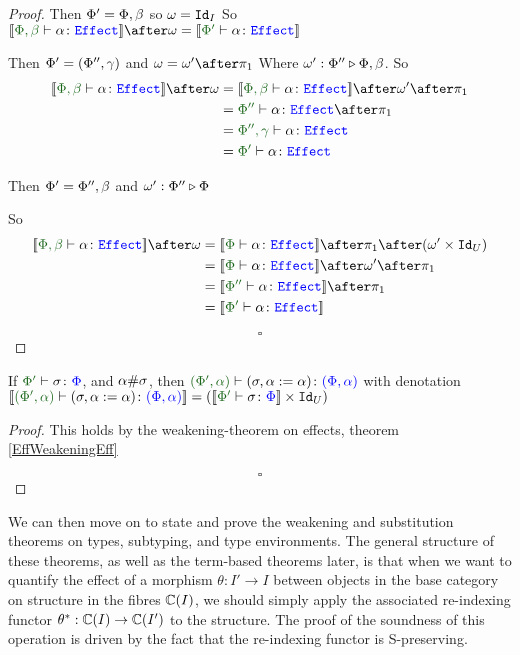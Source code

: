 \documentclass{Report}
\begin{document}
\begin{proof}
    \subcase{$\w=\i$}
    Then $\Phi' = \Phi,\beta$ so $\omega=\texttt{Id}_{I}$
    So $\deno{\typerelation{\P,\b}{\a}{\effect}}\after\w = \deno{\typerelation{\P'}{\a}{\effect}}$
    
    Then $\Phi' = (\Phi'',\gamma)$ and $\w=\w'\after\p$
    Where $\omega' : \Phi'' \triangleright \Phi,\beta$.
    So
    \begin{align*}
        \deno{\typerelation{\P,\b}{\a}{\effect}}\after\w & = \deno{\typerelation{\P,\b}{\a}{\effect}}\after\w'\after\p\\
        & = {\typerelation{\P''}{\a}{\effect}}\after\p\\
        & = {\typerelation{\P'',\g}{\a}{\effect}}\\
        & = {\typerelation{\P'}{\a}{\effect}}\\
    \end{align*}
    
    Then $\Phi'=\Phi'',\beta$ and $\omega' : \Phi'' \triangleright \Phi$
    
    So \begin{align*}
        \deno{\typerelation{\P,\b}{\a}{\effect}}\after\w &= \deno{\typerelation{\P}{\a}{\effect}}\after\p\after(\w'\times\Id{U})\\
        &=\deno{\typerelation{\P}{\a}{\effect}}\after\w'\after\p\\
        & = \deno{\typerelation{\P''}{\a}{\effect}}\after\p\\
        & = \deno{\typerelation{\P'}{\a}{\effect}}\\
    \end{align*}

    $$\square$$
\end{proof}

\begin{lemma}
    If $\typerelation{\P'}{\si}{\P}$, and $\alpha\#\sigma$, then $\typerelation{(\P', \a)}{(\si, \a\setto\a)}{(\P,\a)}$ with denotation $\deno{\typerelation{(\P', \a)}{(\si, \a\setto\a)}{(\P,\a)}} = (\deno{\typerelation{\P'}{\si}{\P}}\times\Id{U})$
\end{lemma}
\begin{proof}
   This holds by the weakening-theorem on effects, theorem \ref{EffWeakeningEff}

   $$\square$$
\end{proof}



We can then move on to state and prove the weakening and substitution theorems on types, subtyping, and type environments. The general structure of these theorems, as well as the term-based theorems later, is that when we want to quantify the effect of a morphism $\theta: I' \rightarrow I$ between objects in the base category on structure in the fibres $\mathbb{C}(I)$, we should simply apply the associated re-indexing functor $\theta^*: \mathbb{C}(I) \rightarrow \mathbb{C}(I')$ to the structure. The proof of the soundness of this operation is driven by the fact that the re-indexing functor is S-preserving.
\end{document}
